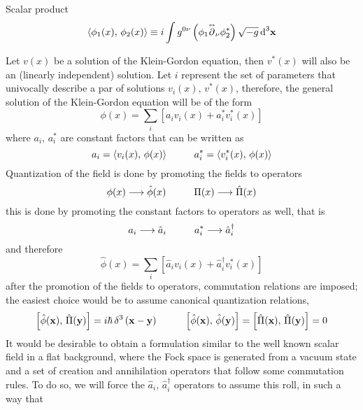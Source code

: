 Scalar product
\begin{equation}
	\langle \phi_1(x),\,\phi_2(x)\rangle\equiv i\int g^{0\nu}\left(\phi_1\overset{\text{\tiny$\leftrightarrow$}}{\partial}_\nu\phi_2^*\right)\sqrt{-g}\,\text{d}^3\mathbf{x}
\end{equation}

Let $v(x)$ be a solution of the Klein-Gordon equation, then $v^*(x)$ will also be an (linearly independent) solution. Let $i$ represent the set of parameters that univocally describe a par of solutions $v_i(x),\,v^*(x)$, therefore, the general solution of the Klein-Gordon equation will be of the form
\begin{equation}
	\phi(x)=\sum_ i\left[a_iv_i(x)+a^*_iv^*_i(x)\right]
\end{equation} 
where $a_i,\,a^*_i$ are constant factors that can be written as
\begin{equation}
	a_i = \langle v_i(x),\,\phi(x)\rangle\hspace{1.0cm} a_i^* = \langle v_i^*(x),\,\phi(x)\rangle
\end{equation}
Quantization of the field is done by promoting the fields to operators
\begin{equation}
	\phi(x)\longrightarrow\hat{\phi}(x)\hspace{1.0cm}\Pi(x)\longrightarrow\hat{\Pi}(x)
\end{equation}
this is done by promoting the constant factors to operators as well, that is
\begin{equation}
	a_i\longrightarrow\hat{a}_i\hspace{1.0cm}a_i^*\longrightarrow\hat{a}_i^\dagger
\end{equation}
and therefore
\begin{equation}
	\hat{\phi}(x)=\sum_i\left[\hat{a}_iv_i(x)+\hat{a}_i^\dagger v^*_i(x)\right]
\end{equation}
after the promotion of the fields to operators, commutation relations are imposed; the easiest choice would be to assume canonical quantization relations,
\begin{equation}
	\left[\hat{\phi}(\mathbf{x}),\,\hat{\Pi}(\mathbf{y})\right]=i\hbar \,\delta^3\left(\mathbf{x}-\mathbf{y}\right)\hspace{1.0cm}\left[\hat{\phi}(\mathbf{x}),\,\hat{\phi}(\mathbf{y})\right]=\left[\hat{\Pi}(\mathbf{x}),\,\hat{\Pi}(\mathbf{y})\right]=0
\end{equation}
It would be desirable to obtain a formulation similar to the well known scalar field in a flat background, where the Fock space is generated from a vacuum state and a set of creation and annihilation operators that follow some commutation rules. To do so, we will force the $\hat{a}_i,\,\hat{a}^\dagger_i$ operators to assume this roll, in such a way that
